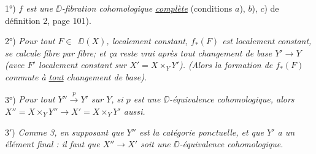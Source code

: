 1°) \textit{$f$ est une $\DD$-fibration cohomologique \underline{complète}} (conditions $a$), $b$), $c$) de définition 2, page 101).

2°) \textit{Pour tout $F \in$} \Ob\,$\DD(X)$\textit{, localement constant, $f_*(F)$ est localement constant, se calcule fibre par fibre; et ça reste vrai après tout changement de base $Y' \to Y$ (avec $F'$ localement constant sur $X' = X \times_Y Y'$). (Alors la formation de $f_*(F)$ commute à \underline{tout} changement de base).}

3°) \textit{Pour tout $Y'' \overset{p}{\to} Y'$ sur $Y$, si $p$ est une $\DD$-équivalence cohomologique, alors $X'' = X \times_Y Y'' \longrightarrow X' = X \times_Y Y'$ aussi.}

3$'$) \textit{Comme 3, en supposant que $Y''$ est la catégorie ponctuelle, et que $Y'$ a un élément final : il faut que $X'' \to X'$ soit une $\DD$-équivalence cohomologique.}

